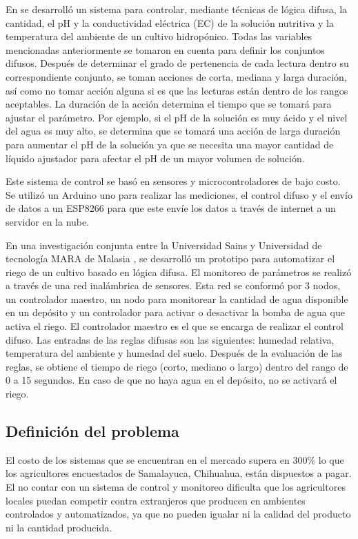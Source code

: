 En \cite{fuzzy_logic_controller} se desarrolló un sistema para controlar, mediante técnicas de lógica difusa, la cantidad, el pH y la conductividad eléctrica (EC) de la solución nutritiva y la temperatura del ambiente de un cultivo hidropónico. Todas las variables mencionadas anteriormente se tomaron en cuenta para definir los conjuntos difusos. Después de determinar el grado de pertenencia de cada lectura dentro su correspondiente conjunto, se toman acciones de corta, mediana y larga duración, así como no tomar acción alguna si es que las lecturas están dentro de los rangos aceptables. La duración de la acción determina el tiempo que se tomará para ajustar el parámetro. Por ejemplo, si el pH de la solución es muy ácido y el nivel del agua es muy alto, se determina que se tomará una acción de larga duración para aumentar el pH de la solución ya que se necesita una mayor cantidad de líquido ajustador para afectar el pH de un mayor volumen de solución. 

Este sistema de control \cite{fuzzy_logic_controller} se basó en sensores y microcontroladores de bajo costo. Se utilizó un Arduino uno para realizar las mediciones, el control difuso y el envío de datos a un ESP8266 para que este envíe los datos a través de internet a un servidor en la nube.

En una investigación conjunta entre la Universidad Sains y Universidad de tecnología MARA de Malasia \cite{fuzzy_systems_agriculture}, se desarrolló un prototipo para automatizar el riego de un cultivo basado en lógica difusa. El monitoreo de parámetros se realizó a través de una red inalámbrica de sensores. Esta red se conformó por 3 nodos, un controlador maestro, un nodo para monitorear la cantidad de agua disponible en un depósito y un controlador para activar o desactivar la bomba de agua que activa el riego. El controlador maestro es el que se encarga de realizar el control difuso. Las entradas de las reglas difusas son las siguientes: humedad relativa, temperatura del ambiente y humedad del suelo. Después de la evaluación de las reglas, se obtiene el tiempo de riego (corto, mediano o largo) dentro del rango de 0 a 15 segundos. En caso de que no haya agua en el depósito, no se activará el riego.


\newpage
\subsection{Definición del problema}
El costo de los sistemas que se encuentran en el mercado supera en 300\% lo que los agricultores encuestados de Samalayuca, Chihuahua, están dispuestos a pagar. El no contar con un sistema de control y monitoreo dificulta que los agricultores locales puedan competir contra extranjeros que producen en ambientes controlados y automatizados, ya que no pueden igualar ni la calidad del producto ni la cantidad producida.

